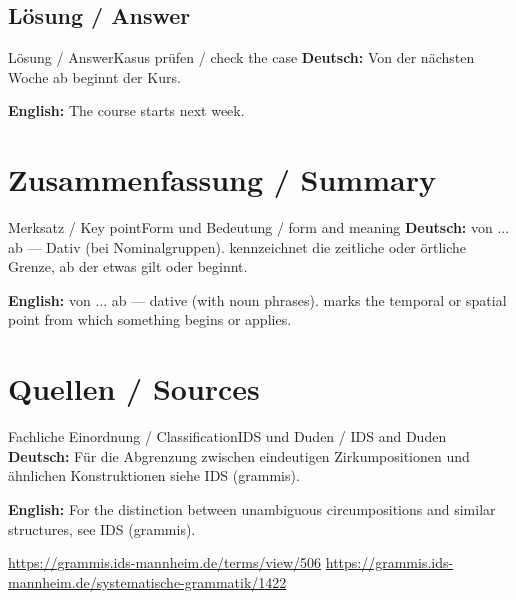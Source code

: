 \documentclass[a4paper,11pt]{article}
\newcommand{\GermanText}[1]{\textbf{Deutsch: }#1\par}
\newcommand{\EnglishText}[1]{{\small\color{SoftGray}\textbf{English: }#1\par}}
\begin{document}
\subsection{Lösung / Answer}
\begin{grammarentry}{Lösung / Answer}{Kasus prüfen / check the case}
\GermanText{Von der nächsten Woche ab beginnt der Kurs.}
\EnglishText{The course starts next week.}
\end{grammarentry}
\section{Zusammenfassung / Summary}
\begin{grammarentry}{Merksatz / Key point}{Form und Bedeutung / form and meaning}
\GermanText{von ... ab — Dativ (bei Nominalgruppen). kennzeichnet die zeitliche oder örtliche Grenze, ab der etwas gilt oder beginnt.}
\EnglishText{von ... ab — dative (with noun phrases). marks the temporal or spatial point from which something begins or applies.}
\end{grammarentry}
\section{Quellen / Sources}
\begin{grammarentry}{Fachliche Einordnung / Classification}{IDS und Duden / IDS and Duden}
\GermanText{Für die Abgrenzung zwischen eindeutigen Zirkumpositionen und ähnlichen Konstruktionen siehe IDS (grammis).}
\EnglishText{For the distinction between unambiguous circumpositions and similar structures, see IDS (grammis).}
\url{https://grammis.ids-mannheim.de/terms/view/506}
\url{https://grammis.ids-mannheim.de/systematische-grammatik/1422}
\end{grammarentry}
\end{document}
